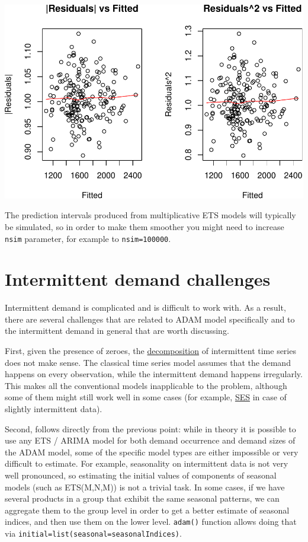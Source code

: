 \documentclass[
]{book}
\theoremstyle{definition}
\theoremstyle{definition}
\theoremstyle{definition}
\theoremstyle{definition}
\theoremstyle{remark}
\begin{document}
\includegraphics{adam_files/figure-latex/unnamed-chunk-128-1.pdf}

The prediction intervals produced from multiplicative ETS models will typically be simulated, so in order to make them smoother you might need to increase \texttt{nsim} parameter, for example to \texttt{nsim=100000}.

\hypertarget{intermittent-demand-challenges}{%
\section{Intermittent demand challenges}\label{intermittent-demand-challenges}}

Intermittent demand is complicated and is difficult to work with. As a result, there are several challenges that are related to ADAM model specifically and to the intermittent demand in general that are worth discussing.

First, given the presence of zeroes, the \protect\hyperlink{ClassicalDecomposition}{decomposition} of intermittent time series does not make sense. The classical time series model assumes that the demand happens on every observation, while the intermittent demand happens irregularly. This makes all the conventional models inapplicable to the problem, although some of them might still work well in some cases (for example, \protect\hyperlink{SES}{SES} in case of slightly intermittent data).

Second, follows directly from the previous point: while in theory it is possible to use any ETS / ARIMA model for both demand occurrence and demand sizes of the ADAM model, some of the specific model types are either impossible or very difficult to estimate. For example, seasonality on intermittent data is not very well pronounced, so estimating the initial values of components of seasonal models (such as ETS(M,N,M)) is not a trivial task. In some cases, if we have several products in a group that exhibit the same seasonal patterns, we can aggregate them to the group level in order to get a better estimate of seasonal indices, and then use them on the lower level. \texttt{adam()} function allows doing that via \texttt{initial=list(seasonal=seasonalIndices)}.
\end{document}

